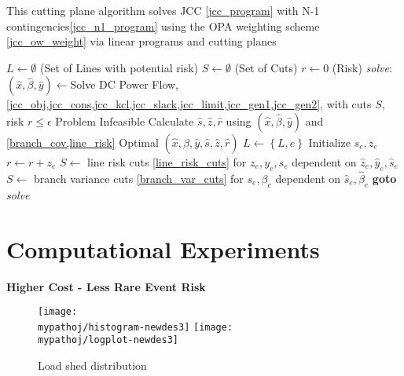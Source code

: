\begin{algorithm}
\caption{This cutting plane algorithm solves JCC \ref{jcc_program} with N-1 contingencies\ref{jcc_n1_program} using the OPA weighting scheme \ref{jcc_ow_weight} via linear programs and cutting planes}\label{jcc_ow_alg}
\begin{algorithmic}
\State $L \gets \emptyset$  (Set of Lines with potential risk)
\State $S \gets \emptyset$  (Set of Cuts)
\State $r \gets 0$ (Risk)
\BState \emph{solve}:
\State $(\hat{x},\hat{\beta},\hat{y}) \gets $Solve DC Power Flow, \cref{jcc_obj,jcc_cons,jcc_kcl,jcc_slack,jcc_limit,jcc_gen1,jcc_gen2}, with cuts $S$, risk $r\leq\epsilon$
 \Return Problem Infeasible 
\EndIf
\State Calculate $\hat{s},\hat{z},\hat{r}$ using $(\hat{x},\hat{\beta},\hat{y})$ and \cref{branch_cov,line_risk}
 \Return Optimal $(\hat{x},\hat{\beta},\hat{y},\hat{s},\hat{z},\hat{r})$
\EndIf
{}
            \State $L \gets \left\{L,e\right\}$
            \State Initialize $s_e,z_e$
            \State $r \gets r + z_e$
    \EndIf            
    \State $S \gets$ line risk cuts \ref{line_risk_cuts} for $z_e,y_e,s_e$ dependent on $\hat{z}_e,\hat{y}_e,\hat{s}_e$
    \State $S \gets$ branch variance cuts \ref{branch_var_cuts} for $s_e,\beta_e$ dependent on $\hat{s}_e,\hat{\beta}_e$
\EndIf
\EndFor
\State \textbf{goto} \emph{solve}
\EndProcedure
\end{algorithmic}
\end{algorithm}



\section{Computational Experiments}



\textbf{Higher Cost - Less Rare Event Risk}

\begin{figure}
\centering
\texttt{[image: \\mypathoj/histogram-newdes3]}
\texttt{[image: \\mypathoj/logplot-newdes3]}
\caption{Load shed distribution}
\end{figure}


